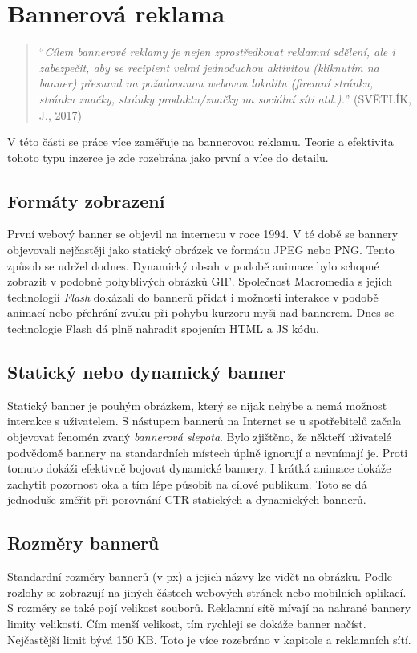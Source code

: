 \section{Bannerová reklama}
    \begin{quote}
        \enquote{\emph{Cílem bannerové reklamy je nejen zprostředkovat reklamní sdělení, ale i zabezpečit, aby se recipient velmi jednoduchou aktivitou
        (kliknutím na banner) přesunul na požadovanou webovou lokalitu (firemní stránku, stránku značky, stránky produktu/značky na sociální síti atd.).}}
        (SVĚTLÍK, J., 2017) \cite{svetlik:reklama}
    \end{quote}

    V této části se práce více zaměřuje na bannerovou reklamu. Teorie a efektivita tohoto typu inzerce je zde rozebrána jako první a více do detailu.

    \subsection{Formáty zobrazení}
    První webový banner se objevil na internetu v roce 1994. V té době se bannery objevovali nejčastěji jako statický obrázek ve formátu
    JPEG nebo PNG. Tento způsob se udržel dodnes. Dynamický obsah v podobě animace bylo schopné zobrazit v podobně pohyblivých obrázků GIF.
    Společnost Macromedia s jejich technologií \emph{Flash} dokázali do bannerů přidat i možnosti interakce v podobě animací nebo přehrání zvuku při
    pohybu kurzoru myši nad bannerem. Dnes se technologie Flash dá plně nahradit spojením HTML a JS kódu. 

    \subsection{Statický nebo dynamický banner}
    Statický banner je pouhým obrázkem, který se nijak nehýbe a nemá možnost interakce s uživatelem. S nástupem bannerů na Internet se u
    spotřebitelů začala objevovat fenomén zvaný \emph{bannerová slepota}. Bylo zjištěno, že někteří uživatelé podvědomě bannery na standardních místech
    úplně ignorují a nevnímají je. Proti tomuto dokáži efektivně bojovat dynamické bannery.
    I krátká animace dokáže zachytit pozornost oka a tím lépe působit na cílové publikum.
    Toto se dá jednoduše změřit při porovnání CTR statických a dynamických bannerů.

    \subsection{Rozměry bannerů}
    Standardní rozměry bannerů (v px) a jejich názvy lze vidět na obrázku. Podle rozlohy se zobrazují na jiných částech webových stránek nebo
    mobilních aplikací. S rozměry se také pojí velikost souborů. Reklamní sítě mívají na nahrané bannery limity velikostí.
    Čím menší velikost, tím rychleji se dokáže banner načíst. Nejčastější limit bývá 150 KB. Toto je více rozebráno v kapitole a reklamních sítí.

